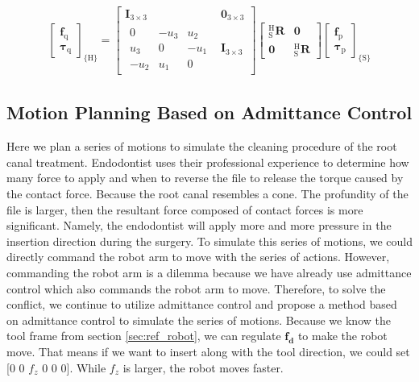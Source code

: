 \begin{equation}
\label{eq: ref_sensor}
\begin{split}
\begin{bmatrix}
\boldsymbol{f}_\mathrm{q}\\ 
\boldsymbol{\tau}_\mathrm{q}
\end{bmatrix}
_{\{ \mathrm{H}\}}
=
\begin{bmatrix}
\mathbf{I}_{3 \times 3} & \boldsymbol{0}_{3 \times 3}\\ 
\begin{matrix}
0		&-u_3		&u_2		\\
u_3		&0			&-u_1		\\
-u_2	&u_1		&0		
\end{matrix} & \mathbf{I}_{3 \times 3}
\end{bmatrix}
\begin{bmatrix}
_\mathrm{S}^\mathrm{H}\mathbf{R} & \boldsymbol{0}\\ 
\boldsymbol{0} & _\mathrm{S}^\mathrm{H}\mathbf{R}
\end{bmatrix}
\begin{bmatrix}
\boldsymbol{f}_\mathrm{p}\\ 
\boldsymbol{\tau}_\mathrm{p}
\end{bmatrix}
_{\{ \mathrm{S}\}}
\end{split}
\end{equation}
\subsection*{Motion Planning Based on Admittance Control}
\label{sec:motion planning} 
\hspace*{6mm}Here we plan a series of motions to simulate the cleaning procedure of the root canal treatment. Endodontist uses their professional experience to determine how many force to apply and when to reverse the file to release the torque caused by the contact force. Because the root canal resembles a cone. The profundity of the file is larger, then the resultant force composed of contact forces is more significant. Namely, the endodontist will apply more and more pressure in the insertion direction during the surgery. To simulate this series of motions, we could directly command the robot arm to move with the series of actions. However, commanding the robot arm is a dilemma because we have already use admittance control which also commands the robot arm to move. Therefore, to solve the conflict, we continue to utilize admittance control and propose a method based on admittance control to simulate the series of motions. Because we know the tool frame from section \ref{sec:ref_robot}, we can regulate $\boldsymbol{f_d}$ to make the robot move. That means if we want to insert along with the tool direction, we could set [$0$ $0$ $f_z$ $0$ $0$ $0$]. While $f_z$ is larger, the robot moves faster.

